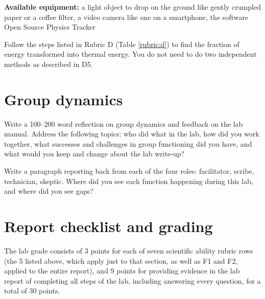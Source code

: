 \textbf{Available equipment:} a light object to drop on the ground like gently crumpled paper or a coffee filter, a video camera like one on a smartphone, the software Open Source Physics Tracker

\begin{steps}
	\item Follow the steps listed in Rubric D (Table \ref{rubric:d}) to find the fraction of energy transformed into thermal energy. You do not need to do two independent methods as described in D5.
\end{steps}

\section{Group dynamics}

\begin{steps}
	\item Write a 100--200 word reflection on group dynamics and feedback on the lab manual. Address the following topics: who did what in the lab, how did you work together, what successes and challenges in group functioning did you have, and what would you keep and change about the lab write-up?
	
	\item Write a paragraph reporting back from each of the four roles: facilitator, scribe, technician, skeptic. Where did you see each function happening during this lab, and where did you see gaps?
\end{steps}

\section{Report checklist and grading}

The lab grade consists of 3 points for each of seven scientific ability rubric rows (the 5 listed above, which apply just to that section, as well as F1 and F2, applied to the entire report), and 9 points for providing evidence in the lab report of completing all steps of the lab, including answering every question, for a total of 30 points.